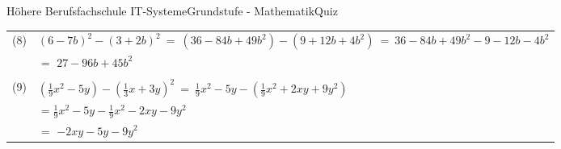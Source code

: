 \documentclass[oneside,openany,headings=optiontotoc,11pt,numbers=noenddot]{scrreprt}
\begin{document}
\begin{worksheet}{Höhere Berufsfachschule IT-Systeme}{Grundstufe - Mathematik}{Quiz}
\begin{framed}
\begin{tabularx}{\textwidth}{lX}
				\\
				(8) & \((6-7b)^2 - (3 +2b)^2\ =\ (36 -84b +49b^2) - (9 +12b +4b^2)\ =\ 36 -84b +49b^2 - 9 -12b -4b^2\)\\
				& \(=\) \underline{\(27 -96b +45b^2\)}\\
				\\
				(9) & \((\frac{1}{9}x^2-5y)-(\frac{1}{3}x + 3y)^2\ =\ \frac{1}{9}x^2 - 5y - (\frac{1}{9}x^2 +2xy +9y^2)\)\\
				& \(= \frac{1}{9}x^2 - 5y - \frac{1}{9}x^2 - 2xy - 9y^2\)\\
				& \(=\) \underline{\(-2xy -5y -9y^2\)}\\
			\end{tabularx}
		\end{framed}
	\end{worksheet}
\end{document}
